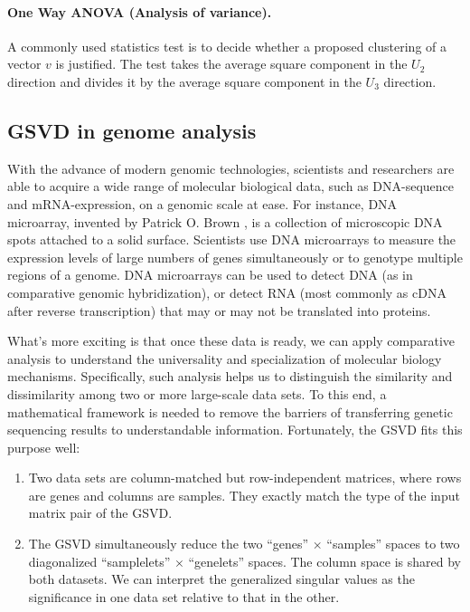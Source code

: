 \paragraph{One Way ANOVA (Analysis of variance).}
A commonly used statistics test is to decide whether a proposed clustering of a vector $v$ is justified. The test takes the average square component in the $U_2$ direction and divides it by the average square component in the $U_3$ direction. \cite{wikipedia_2020}


\subsection{GSVD in genome analysis} \label{genome-app}
With the advance of modern genomic technologies, scientists and researchers are able to acquire a wide range of molecular biological data, such as DNA-sequence and mRNA-expression, on a genomic scale at ease. For instance, DNA microarray, invented by Patrick O. Brown \cite{schena1995quantitative}, is a collection of microscopic DNA spots attached to a solid surface. Scientists use DNA microarrays to measure the expression levels of large numbers of genes simultaneously or to genotype multiple regions of a genome. DNA microarrays can be used to detect DNA (as in comparative genomic hybridization), or detect RNA (most commonly as cDNA after reverse transcription) that may or may not be translated into proteins.

What's more exciting is that once these data is ready, we can apply comparative analysis to understand the universality and specialization of molecular biology mechanisms. Specifically, such analysis helps us to distinguish the similarity and dissimilarity among two or more large-scale data sets. To this end, a mathematical framework is needed to remove the barriers of transferring genetic sequencing results to understandable information. Fortunately, the GSVD fits this purpose well: 
\begin{enumerate}
\item Two data sets are column-matched but row-independent matrices, where rows are genes and columns are samples. They exactly match the type of the input matrix pair of the GSVD. 
\item The GSVD simultaneously reduce the two ``genes'' $\times$ ``samples'' spaces to two diagonalized ``samplelets'' $\times$ ``genelets'' spaces. The column space is shared by both datasets. We can interpret the generalized singular values as the significance in one data set relative to that in the other.
\end{enumerate}

